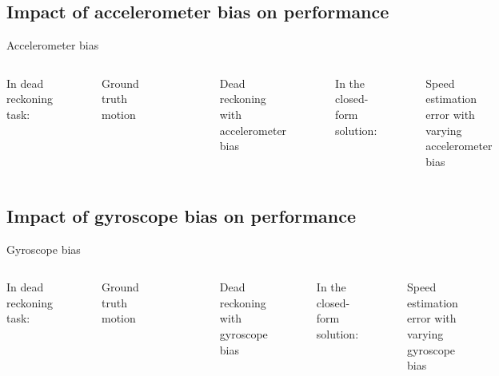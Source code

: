 \documentclass{beamer}
\begin{document}
\subsection{Impact of accelerometer bias on performance}
\begin{frame}{Accelerometer bias}
  \begin{columns}[T]
    In dead reckoning task:
    \begin{figure}[h!]
      \centering
      \resizebox{0.85\textwidth}{!}{}
      \caption{Ground truth motion}
    \end{figure}
    \begin{figure}[h!]
      \centering
      \resizebox{0.85\textwidth}{!}{}
      \caption{Dead reckoning with accelerometer bias}
   \end{figure}

    In the closed-form solution:
    \begin{figure}[h!]
      \centering
      \resizebox{0.85\textwidth}{!}{}
      \caption{Speed estimation error with varying accelerometer bias}
    \end{figure}
  \end{columns}
\end{frame}

\subsection{Impact of gyroscope bias on performance}
\begin{frame}{Gyroscope bias}
  \begin{columns}[T]
    In dead reckoning task:
    \begin{figure}[h!]
      \centering
      \resizebox{0.85\textwidth}{!}{}
      \caption{Ground truth motion}
    \end{figure}
    \begin{figure}[h!]
      \centering
      \resizebox{0.85\textwidth}{!}{}
      \caption{Dead reckoning with gyroscope bias}
    \end{figure}

    In the closed-form solution:
    \begin{figure}[h!]
      \centering
      \resizebox{0.85\textwidth}{!}{}
      \caption{Speed estimation error with varying gyroscope bias}
    \end{figure}
  \end{columns}\end{frame}
\end{document}
